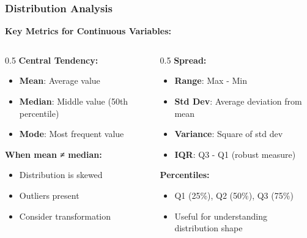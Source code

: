 \documentclass[aspectratio=169]{beamer}
\begin{document}
\begin{frame}
\frametitle{Distribution Analysis}

\textbf{Key Metrics for Continuous Variables:}

\begin{columns}[T]
    \begin{column}{0.5\textwidth}
        \textbf{Central Tendency:}
        \begin{itemize}
            \item \textbf{Mean}: Average value
            \item \textbf{Median}: Middle value (50th percentile)
            \item \textbf{Mode}: Most frequent value
        \end{itemize}

        \vspace{0.3cm}

        \textbf{When mean ≠ median:}
        \begin{itemize}
            \item Distribution is skewed
            \item Outliers present
            \item Consider transformation
        \end{itemize}
    \end{column}
    \begin{column}{0.5\textwidth}
        \textbf{Spread:}
        \begin{itemize}
            \item \textbf{Range}: Max - Min
            \item \textbf{Std Dev}: Average deviation from mean
            \item \textbf{Variance}: Square of std dev
            \item \textbf{IQR}: Q3 - Q1 (robust measure)
        \end{itemize}

        \vspace{0.3cm}

        \textbf{Percentiles:}
        \begin{itemize}
            \item Q1 (25\%), Q2 (50\%), Q3 (75\%)
            \item Useful for understanding distribution shape
        \end{itemize}
    \end{column}
\end{columns}

\end{frame}
\end{document}
